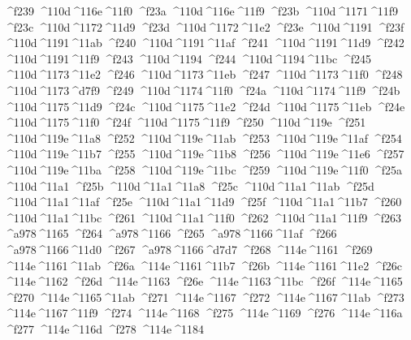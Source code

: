 \checkit ^^^^f239 ^^^^110d^^^^116e^^^^11f0
\checkit ^^^^f23a ^^^^110d^^^^116e^^^^11f9
\checkit ^^^^f23b ^^^^110d^^^^1171^^^^11f9
\checkit ^^^^f23c ^^^^110d^^^^1172^^^^11d9
\checkit ^^^^f23d ^^^^110d^^^^1172^^^^11e2
\checkit ^^^^f23e ^^^^110d^^^^1191
\checkit ^^^^f23f ^^^^110d^^^^1191^^^^11ab
\checkit ^^^^f240 ^^^^110d^^^^1191^^^^11af
\checkit ^^^^f241 ^^^^110d^^^^1191^^^^11d9
\checkit ^^^^f242 ^^^^110d^^^^1191^^^^11f9
\checkit ^^^^f243 ^^^^110d^^^^1194
\checkit ^^^^f244 ^^^^110d^^^^1194^^^^11bc
\checkit ^^^^f245 ^^^^110d^^^^1173^^^^11e2
\checkit ^^^^f246 ^^^^110d^^^^1173^^^^11eb
\checkit ^^^^f247 ^^^^110d^^^^1173^^^^11f0
\checkit ^^^^f248 ^^^^110d^^^^1173^^^^d7f9
\checkit ^^^^f249 ^^^^110d^^^^1174^^^^11f0
\checkit ^^^^f24a ^^^^110d^^^^1174^^^^11f9
\checkit ^^^^f24b ^^^^110d^^^^1175^^^^11d9
\checkit ^^^^f24c ^^^^110d^^^^1175^^^^11e2
\checkit ^^^^f24d ^^^^110d^^^^1175^^^^11eb
\checkit ^^^^f24e ^^^^110d^^^^1175^^^^11f0
\checkit ^^^^f24f ^^^^110d^^^^1175^^^^11f9
\checkit ^^^^f250 ^^^^110d^^^^119e
\checkit ^^^^f251 ^^^^110d^^^^119e^^^^11a8
\checkit ^^^^f252 ^^^^110d^^^^119e^^^^11ab
\checkit ^^^^f253 ^^^^110d^^^^119e^^^^11af
\checkit ^^^^f254 ^^^^110d^^^^119e^^^^11b7
\checkit ^^^^f255 ^^^^110d^^^^119e^^^^11b8
\checkit ^^^^f256 ^^^^110d^^^^119e^^^^11e6
\checkit ^^^^f257 ^^^^110d^^^^119e^^^^11ba
\checkit ^^^^f258 ^^^^110d^^^^119e^^^^11bc
\checkit ^^^^f259 ^^^^110d^^^^119e^^^^11f0
\checkit ^^^^f25a ^^^^110d^^^^11a1
\checkit ^^^^f25b ^^^^110d^^^^11a1^^^^11a8
\checkit ^^^^f25c ^^^^110d^^^^11a1^^^^11ab
\checkit ^^^^f25d ^^^^110d^^^^11a1^^^^11af
\checkit ^^^^f25e ^^^^110d^^^^11a1^^^^11d9
\checkit ^^^^f25f ^^^^110d^^^^11a1^^^^11b7
\checkit ^^^^f260 ^^^^110d^^^^11a1^^^^11bc
\checkit ^^^^f261 ^^^^110d^^^^11a1^^^^11f0
\checkit ^^^^f262 ^^^^110d^^^^11a1^^^^11f9
\checkit ^^^^f263 ^^^^a978^^^^1165
\checkit ^^^^f264 ^^^^a978^^^^1166
\checkit ^^^^f265 ^^^^a978^^^^1166^^^^11af
\checkit ^^^^f266 ^^^^a978^^^^1166^^^^11d0
\checkit ^^^^f267 ^^^^a978^^^^1166^^^^d7d7
\checkit ^^^^f268 ^^^^114e^^^^1161
\checkit ^^^^f269 ^^^^114e^^^^1161^^^^11ab
\checkit ^^^^f26a ^^^^114e^^^^1161^^^^11b7
\checkit ^^^^f26b ^^^^114e^^^^1161^^^^11e2
\checkit ^^^^f26c ^^^^114e^^^^1162
\checkit ^^^^f26d ^^^^114e^^^^1163
\checkit ^^^^f26e ^^^^114e^^^^1163^^^^11bc
\checkit ^^^^f26f ^^^^114e^^^^1165
\checkit ^^^^f270 ^^^^114e^^^^1165^^^^11ab
\checkit ^^^^f271 ^^^^114e^^^^1167
\checkit ^^^^f272 ^^^^114e^^^^1167^^^^11ab
\checkit ^^^^f273 ^^^^114e^^^^1167^^^^11f9
\checkit ^^^^f274 ^^^^114e^^^^1168
\checkit ^^^^f275 ^^^^114e^^^^1169
\checkit ^^^^f276 ^^^^114e^^^^116a
\checkit ^^^^f277 ^^^^114e^^^^116d
\checkit ^^^^f278 ^^^^114e^^^^1184
